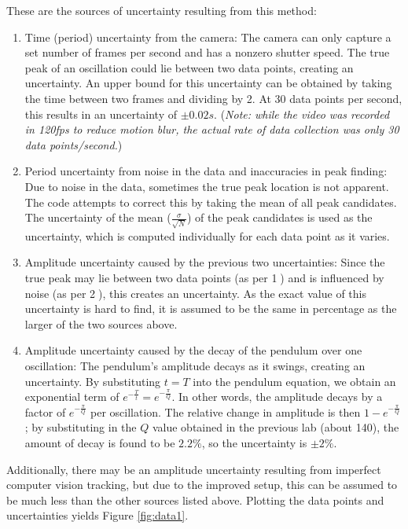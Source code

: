 \documentclass[aps,twocolumn,secnumarabic,nobalancelastpage,amsmath,amssymb,nofootinbib,floatfix,letterpaper]{revtex4}
\begin{document}
These are the sources of uncertainty resulting from this method:
\begin{enumerate}
    \item Time (period) uncertainty from the camera: The camera can only capture a set number of frames per second and
          has a nonzero shutter speed. The true peak of an oscillation could lie between two data points, creating an
          uncertainty. An upper bound for this uncertainty can be obtained by taking the time between two frames and
          dividing by 2. At 30 data points per second, this results in an uncertainty of \(\pm 0.02\si{s}\).
          (\textit{Note: while the video was recorded in 120fps to reduce motion blur, the actual rate of data
          collection was only 30 data points/second.})
    \item Period uncertainty from noise in the data and inaccuracies in peak finding: Due to noise in the data,
          sometimes the true peak location is not apparent. The code attempts to correct this by taking the mean of all
          peak candidates. The uncertainty of the mean ($\frac{\sigma}{\sqrt{N}}$) of the peak candidates is used as the
          uncertainty, which is computed individually for each data point as it varies.
    \item Amplitude uncertainty caused by the previous two uncertainties: Since the true peak may lie between two data
          points (as per \textcircled{1}) and is influenced by noise (as per \textcircled{2}), this creates an
          uncertainty. As the exact value of this uncertainty is hard to find, it is assumed to be the same in
          percentage as the larger of the two sources above.
    \item Amplitude uncertainty caused by the decay of the pendulum over one oscillation: The pendulum's amplitude
          decays as it swings, creating an uncertainty. By substituting $t = T$ into the pendulum equation, we obtain
          an exponential term of $e^{-\frac{T}{t}} = e^{-\frac{\pi}{Q}}$. In other words, the amplitude decays by a
          factor of $e^{-\frac{\pi}{Q}}$ per oscillation. The relative change in amplitude is then
          $1 - e^{-\frac{\pi}{Q}}$; by substituting in the $Q$ value obtained in the previous lab (about 140), the
          amount of decay is found to be $2.2\%$, so the uncertainty is \(\pm 2\%\).
\end{enumerate}

Additionally, there may be an amplitude uncertainty resulting from imperfect computer vision tracking, but due to the
improved setup, this can be assumed to be much less than the other sources listed above. Plotting the data points and
uncertainties yields Figure \ref{fig:data1}.
\end{document}
